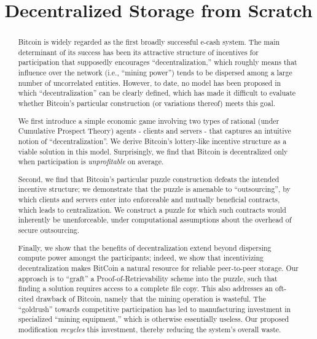 \documentclass{article}
\begin{document}
\title{Decentralized Storage from Scratch}

\maketitle

\begin{abstract}
  Bitcoin is widely regarded as the first broadly successful e-cash system. The main determinant of its success has been its attractive structure of incentives for participation that supposedly encourages ``decentralization,'' which roughly means that influence over the network (i.e., ``mining power'') tends to be dispersed among a large number of uncorrelated entities. However, to date, no model has been proposed in which ``decentralization'' can be clearly defined, which has made it difficult to evaluate whether Bitcoin's particular construction (or variations thereof) meets this goal.

We first introduce a simple economic game involving two types of rational (under Cumulative Prospect Theory) agents - clients and servers - that captures an intuitive notion of ``decentralization''. We derive Bitcoin's lottery-like incentive structure as a viable solution in this model. Surprisingly, we find that Bitcoin is decentralized only when participation is {\em unprofitable} on average.

Second, we find that Bitcoin's particular puzzle construction defeats the intended incentive structure; we demonstrate that the puzzle is amenable to ``outsourcing'', by which clients and servers enter into enforceable and mutually beneficial contracts, which leads to centralization. We construct a puzzle for which such contracts would inherently be unenforceable, under computational assumptions about the overhead of secure outsourcing.

Finally, we show that the benefits of decentralization extend beyond dispersing compute power amongst the participants; indeed, we show that incentivizing decentralization makes BitCoin a natural resource for reliable peer-to-peer storage. Our approach is to ``graft'' a Proof-of-Retrievability scheme into the puzzle, such that finding a solution requires access to a complete file copy. This also addresses an oft-cited drawback of Bitcoin, namely that the mining operation is wasteful. The ``goldrush'' towards competitive participation has led to manufacturing investment in specialized ``mining equipment,'' which is otherwise essentially useless. Our proposed modification {\em recycles} this investment, thereby reducing the system's overall waste.
\end{abstract}
\end{document}
